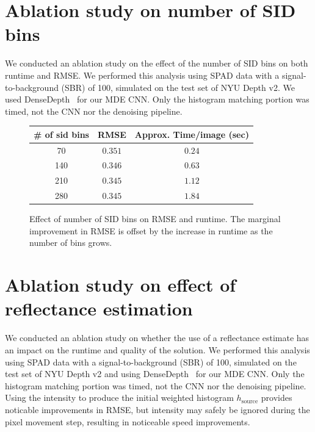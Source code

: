 \documentclass[runningheads]{llncs}
\begin{document}
\section{Ablation study on number of SID bins}
We conducted an ablation study on the effect of the number of SID bins
\cite{Fu2018} on both runtime and RMSE. We performed this analysis using SPAD
data with a signal-to-background (SBR) of 100, simulated on the test set of NYU
Depth v2. We used DenseDepth~\cite{Alhashim2018} for our MDE CNN.
Only the histogram matching portion was timed, not the CNN nor the
denoising pipeline.

\begin{figure}[H]
  \centering
  \begin{tabular}{c|cc}
    \toprule
    \# of sid bins & RMSE & Approx. Time/image (sec) \\
    \midrule
    70  & $0.351$ & $0.24$ \\
    140 & $0.346$ & $0.63$ \\
    210 & $0.345$ & $1.12$ \\
    280 & $0.345$ & $1.84$ \\
    \bottomrule
  \end{tabular}
  \caption{Effect of number of SID bins on RMSE and runtime. The marginal
    improvement in RMSE is offset by the increase in runtime as the number of
    bins grows.}
  \label{fig:sid_ablation}
\end{figure}


\section{Ablation study on effect of reflectance estimation}
We conducted an ablation study on whether the use of a reflectance
estimate has an impact on the runtime and quality of the solution.
We performed this analysis using SPAD
data with a signal-to-background (SBR) of 100, simulated on the test set of NYU
Depth v2 and using DenseDepth~\cite{Alhashim2018} for our MDE CNN.
Only the histogram matching portion was timed, not the CNN nor the denoising
pipeline. Using the intensity to produce the initial weighted histogram
$h_{\text{source}} $ provides noticable improvements
in RMSE, but intensity may safely be ignored during the pixel movement step,
resulting in noticeable speed improvements.
\end{document}
